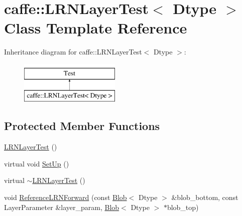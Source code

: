\hypertarget{classcaffe_1_1_l_r_n_layer_test}{\section{caffe\+:\+:L\+R\+N\+Layer\+Test$<$ Dtype $>$ Class Template Reference}
\label{classcaffe_1_1_l_r_n_layer_test}
}
Inheritance diagram for caffe\+:\+:L\+R\+N\+Layer\+Test$<$ Dtype $>$\+:\begin{figure}[H]
\begin{center}
\leavevmode
\includegraphics[height=2.000000cm]{classcaffe_1_1_l_r_n_layer_test}
\end{center}
\end{figure}
\subsection*{Protected Member Functions}
\begin{DoxyCompactItemize}
\item 
\hyperlink{classcaffe_1_1_l_r_n_layer_test_ace946d42913dc95ddac1b25ed5396088}{L\+R\+N\+Layer\+Test} ()
\item 
virtual void \hyperlink{classcaffe_1_1_l_r_n_layer_test_ad2523c7ee9662f281f49111b66080665}{Set\+Up} ()
\item 
virtual \hyperlink{classcaffe_1_1_l_r_n_layer_test_a5211067864feda1c496e684a8013c2dd}{$\sim$\+L\+R\+N\+Layer\+Test} ()
\item 
void \hyperlink{classcaffe_1_1_l_r_n_layer_test_a0a2026de787f7c723ede217b4312573c}{Reference\+L\+R\+N\+Forward} (const \hyperlink{classcaffe_1_1_blob}{Blob}$<$ Dtype $>$ \&blob\+\_\+bottom, const Layer\+Parameter \&layer\+\_\+param, \hyperlink{classcaffe_1_1_blob}{Blob}$<$ Dtype $>$ $\ast$blob\+\_\+top)
\end{DoxyCompactItemize}
